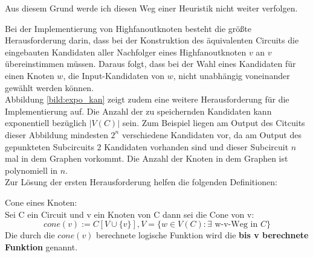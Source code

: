 \documentclass[11pt, a4paper, german]{article}
\begin{document}
Aus diesem Grund werde ich diesen Weg einer Heuristik nicht weiter verfolgen.

Bei der Implementierung von Highfanoutknoten besteht die größte Herausforderung darin, dass bei der Konstruktion des äquivalenten Circuits die eingebauten Kandidaten aller Nachfolger eines Highfanoutknoten $v$ an $v$ übereinstimmen müssen. Daraus folgt, dass bei der Wahl eines Kandidaten für einen Knoten $w$, die  Input-Kandidaten von $w$, nicht unabhängig voneinander gewählt werden können. \\

Abbildung \ref{bild:expo_kan} zeigt zudem eine weitere Herausforderung für die Implementierung auf. Die Anzahl der zu speichernden Kandidaten kann  exponentiell bezüglich $|V(C)|$ sein. Zum Beispiel liegen am Output des Citcuits dieser Abbildung mindesten $2^n$ verschiedene Kandidaten vor, da am Output des gepunkteten Subcircuits  2 Kandidaten vorhanden sind und dieser Subcircuit $n$ mal in dem Graphen vorkommt. Die Anzahl der Knoten in dem Graphen ist polynomiell in $n$.  \\
Zur Lösung der ersten Herausforderung helfen die folgenden Definitionen:\\

\begin{definition}{Cone eines Knoten:}\\
	Sei C ein Circuit und v ein Knoten von C dann sei die Cone von v: 
	\[ cone(v) := C[V \cup \{ v \}], V = \{ w \in V(C) : \exists \text{ w-v-Weg in }  C \} \] 
	Die durch die $cone(v)$ berechnete logische Funktion wird die	{\bf bis v berechnete Funktion} genannt.
\end{definition}
\end{document}
